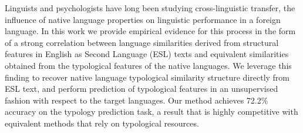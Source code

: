 Linguists and psychologists have long been studying cross-linguistic transfer, the influence of native language properties on linguistic performance in a foreign language. In this work we provide empirical evidence for this process in the form of a strong correlation between language similarities derived from structural features in English as Second Language (ESL) texts and equivalent similarities obtained from the typological features of the native languages. We leverage this finding to recover native language typological similarity structure directly from ESL text, and perform prediction of typological features in an unsupervised fashion with respect to the target languages. Our method achieves 72.2\% accuracy on the typology prediction task, a result that is highly competitive with equivalent methods that rely on typological resources.
